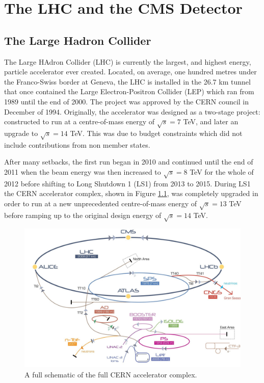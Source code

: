\chapter{The LHC and the CMS Detector} \label{chap-detector}

\section{The Large Hadron Collider} \label{sec-TheLargeHadronCollider}

The Large HAdron Collider (LHC) is currently the largest, and highest energy, particle accelerator ever created. Located, on average, one hundred metres under the Franco-Swiss border at Geneva, the LHC is installed in the 26.7 km tunnel that once contained the Large Electron-Positron Collider (LEP) which ran from 1989 until the end of 2000. The project was approved by the CERN council in December of 1994. Originally, the accelerator was designed as a two-stage project: constructed to run at a centre-of-mass energy of $\sqrt{s}=7$ TeV, and later an upgrade to $\sqrt{s}=14$ TeV. This was due to budget constraints which did not include contributions from non member states. 

After many setbacks, the first run began in 2010 and continued until the end of 2011 when the beam energy was then increased to $\sqrt{s}=8$ TeV for the whole of 2012 before shifting to Long Shutdown 1 (LS1) from 2013 to 2015. During LS1 the CERN accelerator complex, shown in Figure \ref{fig-CERNAcceleratorComplex}, was completely upgraded in order to run at a new unprecedented centre-of-mass energy of $\sqrt{s}=13$ TeV before ramping up to the original design energy of $\sqrt{s}=14$ TeV. 

\begin{figure}
\includegraphics[width=\textwidth]{Figures/CERNAcceleratorComplex.jpg}
\caption{A full schematic of the full CERN accelerator complex.}
\label{fig-CERNAcceleratorComplex}
\end{figure}

